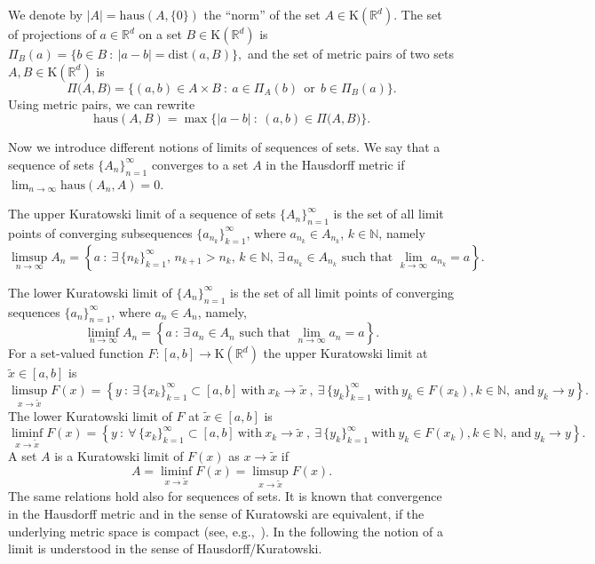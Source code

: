 \documentclass[final,3p,mathptmx]{article}%
\newcommand{\R}{{\mathbb R}}
\newcommand{\N}{{\mathbb N}}
\newcommand{\Rd}{{\R}^d}
\newcommand{\Comp}{\mathrm{K}(\Rd)}
\newcommand{\inK}{\in\Comp}
\newcommand{\haus}{\mathrm{haus}}
\newcommand{\dist}{\mathrm{dist}}
\newcommand{\PrjXonY}[2]{\Pi_{#2}{(#1)} }
\newcommand{\Pair}[2]{\Pi \big ( {#1},{#2} \big )}
\begin{document}
{{{{ We denote by $|A|=\haus (A,\{0\})$ the ``norm'' of the set $A \in \Comp$.
The set of projections of $a \in \Rd$ on a set $B \inK$ is
$
\PrjXonY{a}{B}=\{b \in B \ : \ |a-b|=\dist(a,B)\},%
$
and the set of metric pairs of two sets $A,B \inK$ is
$$
\Pair{A}{B} = \{(a,b) \in A \times B \ : \ a \in \PrjXonY{b}{A}\;\, \mbox{or}\;\, b\in\PrjXonY{a}{B} \}.%
$$
Using metric pairs, we can rewrite 
\begin{equation} \label{haus_MetrPair}
\haus(A,B)= \max \{|a-b| \ :\ (a,b)\in \Pair{A}{B}\}.
\end{equation}

Now we introduce different notions of limits of sequences of sets. We say that a sequence of sets $\{A_n\}_{n=1}^{\infty}$ converges to a set $A$ in the Hausdorff metric if $\lim_{n \to \infty} \haus(A_n,A) = 0$.

	The upper Kuratowski limit of a sequence of sets $\{A_n\}_{n=1}^{\infty}$  is the set of all limit points of converging subsequences
	$\{a_{n_k}\}_{k=1}^{\infty}$, where ${a_{n_k} \in A_{n_k} }$, $k\in \N$, namely
	$$
	\limsup_{n \to \infty} A_n = \left\{a \ : \  \exists\, \{n_k\}_{k=1}^{\infty},\, n_{k+1}>n_k,\, k\in \N,\ \exists \, a_{n_k} \in A_{n_k} \text{ such that } \lim_{k \to \infty}a_{n_k} = a \right\}.
	$$
	
	The lower Kuratowski limit of $\{A_n\}_{n=1}^{\infty}$ is the set of all limit points of converging sequences
	$\{a_{n}\}_{n=1}^{\infty}$, where $a_{n} \in A_{n} $,  namely,
	$$
	\liminf_{n \to \infty} A_n = \left\{a \ : \  \exists \, a_{n} \in A_{n} \text{ such that } \lim_{n \to \infty}a_{n} = a \right\}.
	$$
For a set-valued function $F:[a,b]\to \Comp$  the upper Kuratowski limit at $\widetilde{x} \in [a,b]$ is 
$$
\limsup_{x \to \widetilde{x}} F(x) = \left\{y \ : \  \exists \, \{x_k\}_{k=1}^{\infty} \subset [a,b] \ \text{with} \  x_k\to\widetilde{x}\ , \ \exists \, \{y_k\}_{k=1}^{\infty} \ \text{with} \ y_k\in F(x_k),  k\in\N, \ \text{and} \ y_k \to y
\right\}.
$$
The lower Kuratowski limit of $F$ at $\widetilde{x} \in [a,b]$  is
$$
\liminf_{x \to \widetilde{x}} F(x) = \left\{y \ : \  \forall \, \{x_k\}_{k=1}^{\infty} \subset [a,b] \ \text{with} \  x_k\to\widetilde{x}\ , \ \exists \, \{y_k\}_{k=1}^{\infty} \ \text{with} \ y_k\in F(x_k),  k\in\N, \ \text{and} \ y_k \to y
\right\}.
$$
A set $A$ is a Kuratowski limit of $F(x)$ as $x \to \widetilde{x}$  if 
$$
A =  \liminf_{x \to \widetilde{x}} F(x)  = \limsup_{x \to \widetilde{x}} F(x).
$$
The same relations hold also for sequences of sets.
It is known that  convergence in the Hausdorff metric and in the sense of Kuratowski are equivalent, if the underlying metric space is compact  (see, e.g.,~\cite[Section 4.4]{AmbrosioTilli:Topics}).  In the following the notion of a limit is understood in the sense of Hausdorff/Kuratowski. 

}}}}
\end{document}
